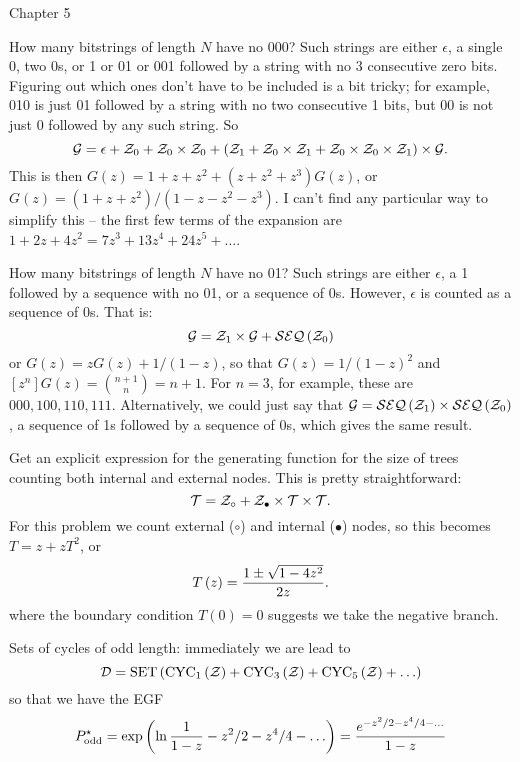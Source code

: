 \vskip 0.3in
\centerline {Chapter 5}
\vskip 0.2in

 How many bitstrings of
length $N$ have no 000?\hfil\break
Such strings are either $\epsilon$, a single 0, two 0s, or 1 or 01 or 001 followed
by a string with no 3 consecutive zero bits.  Figuring out which ones
don't have to be included is a bit tricky; for example, 010 is just 01 followed
by a string with no two consecutive 1 bits, but 00 is not just 0 followed
by any such string.  So
$$
 {\cal G} = \epsilon + {\cal Z}_0 + {\cal Z}_0 \times {\cal Z}_0
   + \left({\cal Z}_1 + {\cal Z}_0 \times {\cal Z}_1 
   + {\cal Z}_0 \times {\cal Z}_0 \times {\cal Z}_1\right) \times {\cal G}.
$$
This is then $G\left(z\right) = 1 + z + z^2 + \left(z + z^2 + z^3\right) G\left(z\right)$,
or $G\left(z\right) = \left(1 + z + z^2\right) / \left(1 - z - z^2 - z^3\right)$.  I can't
find any particular way to simplify this -- the first few terms of the expansion
are $1 + 2z + 4z^2 = 7z^3 + 13z^4 + 24z^5 + \ldots$.

 How many bitstrings of
length $N$ have no 01?\hfil\break
Such strings are either $\epsilon$, a 1 followed by a sequence with no 01,
or a sequence of 0s.  However, $\epsilon$ is counted as a sequence of 0s. That is:
$$
 {\cal G} = {\cal Z}_1 \times {\cal G} + {\cal SEQ}\left({\cal Z}_0\right)
$$
or $G\left(z\right) = z G\left(z\right) + 1 /\left( 1 - z \right) $, so that
$G\left(z\right) = 1 / \left(1 - z\right)^2$ and $\left[z^n\right] G\left(z\right) =
{n + 1 \choose n} = n + 1$.  For $n=3$, for example, these are
$000, 100, 110, 111$.  Alternatively, we could just say that
${\cal G} = {\cal SEQ}\left({\cal Z}_1\right) \times {\cal SEQ}\left({\cal Z}_0\right)$,
a sequence of 1s followed by a sequence of 0s, which gives the same result.

 Get an explicit expression for the 
generating function for the size of trees counting both internal and external nodes.
This is pretty straightforward: 
$$
 {\cal T} = {\cal Z}_{\circ} + {\cal Z}_{\bullet} \times {\cal T} \times {\cal T}.
$$
For this problem we count external ($\circ$) and internal ($\bullet$) nodes,
so this becomes $T = z + z T^2$, or
$$
 T\left(z\right) = {1 \pm \sqrt{1 - 4 z^2} \over 2 z}.
$$
where the boundary condition $T\left(0\right) = 0$ suggests we take the negative branch.

 Sets of cycles of odd length:
immediately we are lead to 
$$
{\cal D} = {\rm SET} \left(
{\rm CYC}_1\left({\cal Z}\right) + {\rm CYC}_3 \left({\cal Z}\right) +
 {\rm CYC}_5 \left({\cal Z}\right) + \ldots \right)
 $$
 so that we have the EGF
 $$
 P^{\star}_{\rm odd} = \exp \left( \ln {1 \over 1 - z } - z^2/2 - z^4/4 - \ldots\right)
  = { e^{-z^2/2 - z^4/4 - \ldots} \over 1 - z }
$$

